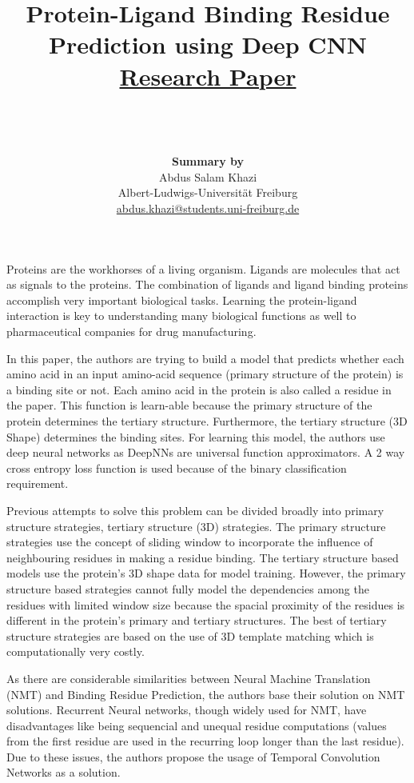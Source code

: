 \documentclass[10pt]{article}
\title{Protein-Ligand Binding Residue Prediction using Deep CNN\\
        \href{https://doi.org/10.1186/s12859-019-2672-1}
                        {Research Paper}}
\author{
                \\
                \\
                \\
                \textbf{Summary by}\\
                Abdus Salam Khazi\\
                Albert-Ludwigs-Universität Freiburg\\
                \href{mailto:abdus.khazi@students.uni-freiburg.de}
                       {abdus.khazi@students.uni-freiburg.de}
}
\date{}
\begin{document}
\maketitle

\newpage
Proteins are the workhorses of a living organism.
Ligands are molecules that act as signals to the proteins.  The combination of ligands and 
ligand binding proteins accomplish very important biological tasks.
Learning the protein-ligand interaction is key to understanding many biological functions 
as well to pharmaceutical companies for drug manufacturing.

In this paper, the authors are trying to build a model that predicts whether each amino acid in an input amino-acid sequence (primary structure of the protein) is a binding site or not. 
Each amino acid in the protein is also called a residue in the paper.
This function is learn-able because the primary structure of the protein determines
the tertiary structure.
Furthermore, the tertiary structure (3D Shape) determines the binding
sites.
For learning this model, the authors use deep neural networks as DeepNNs
are universal function approximators.
A 2 way cross entropy loss function is used because of the binary classification
requirement.

Previous attempts to solve this problem can be divided broadly into primary structure strategies, tertiary structure (3D) strategies. The primary structure strategies use the
concept of sliding window to incorporate the influence of neighbouring residues in making
a residue binding. 
The tertiary structure based models use the protein's 3D shape data for model training.
However, the primary structure based strategies cannot fully model the dependencies among
the residues with limited window size because the spacial proximity of the residues is different in the protein's primary and tertiary structures.
The best of tertiary structure strategies are based on the use of 3D template matching which is computationally very costly.

As there are considerable similarities between Neural Machine Translation (NMT) and Binding Residue Prediction, the authors base their solution on NMT solutions.
Recurrent Neural networks, though widely used for NMT, have disadvantages like being sequencial and unequal residue computations (values from the first residue are used in the recurring loop longer than the last residue).
Due to these issues,  the authors propose the usage of Temporal Convolution Networks
as a solution.
\end{document}
